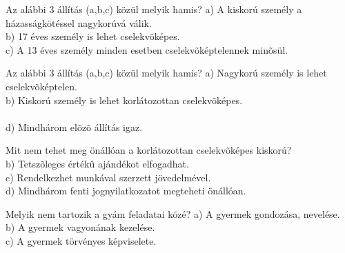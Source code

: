 \begin{frame}

\begin{tcolorbox}[title={44. Kérdés}]
Az alábbi 3 állítás (a,b,c) közül melyik hamis?
\tcblower
a) A kiskorú személy a házasságkötéssel nagykorúvá válik.\\
b) 17 éves személy is lehet cselekvõképes.\\
c) A 13 éves személy minden esetben cselekvõképtelennek minõsül.\\
\end{tcolorbox}

\begin{tcolorbox}[title={45. Kérdés}]
Az alábbi 3 állítás (a,b,c) közül melyik hamis?
\tcblower
a) Nagykorú személy is lehet cselekvõképtelen.\\
b) Kiskorú személy is lehet korlátozottan cselekvõképes.\\
\\
d) Mindhárom elõzõ állítás igaz.
\end{tcolorbox}

\begin{tcolorbox}[title={46. Kérdés}]
Mit nem tehet meg önállóan a korlátozottan cselekvõképes kiskorú?
\tcblower
{}\\
b) Tetszõleges értékû ajándékot elfogadhat.\\
c) Rendelkezhet munkával szerzett jövedelmével.\\
d) Mindhárom fenti jognyilatkozatot megteheti önállóan.
\end{tcolorbox}

\begin{tcolorbox}[title={47. Kérdés}]
Melyik nem tartozik a gyám feladatai közé?
\tcblower
a) A gyermek gondozása, nevelése.\\
b) A gyermek vagyonának kezelése.\\
c) A gyermek törvényes képviselete.\\
\end{tcolorbox}

\end{frame}


